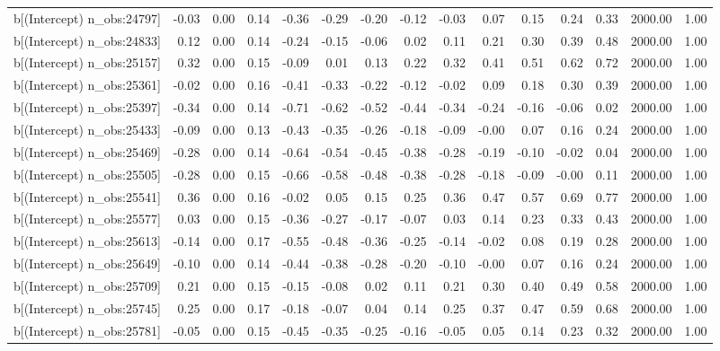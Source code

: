 \begin{table}[ht]
\begin{tabular}{rrrrrrrrrrrrrrr}
  b[(Intercept) n\_obs:24797] & -0.03 & 0.00 & 0.14 & -0.36 & -0.29 & -0.20 & -0.12 & -0.03 & 0.07 & 0.15 & 0.24 & 0.33 & 2000.00 & 1.00 \\ 
  b[(Intercept) n\_obs:24833] & 0.12 & 0.00 & 0.14 & -0.24 & -0.15 & -0.06 & 0.02 & 0.11 & 0.21 & 0.30 & 0.39 & 0.48 & 2000.00 & 1.00 \\ 
  b[(Intercept) n\_obs:25157] & 0.32 & 0.00 & 0.15 & -0.09 & 0.01 & 0.13 & 0.22 & 0.32 & 0.41 & 0.51 & 0.62 & 0.72 & 2000.00 & 1.00 \\ 
  b[(Intercept) n\_obs:25361] & -0.02 & 0.00 & 0.16 & -0.41 & -0.33 & -0.22 & -0.12 & -0.02 & 0.09 & 0.18 & 0.30 & 0.39 & 2000.00 & 1.00 \\ 
  b[(Intercept) n\_obs:25397] & -0.34 & 0.00 & 0.14 & -0.71 & -0.62 & -0.52 & -0.44 & -0.34 & -0.24 & -0.16 & -0.06 & 0.02 & 2000.00 & 1.00 \\ 
  b[(Intercept) n\_obs:25433] & -0.09 & 0.00 & 0.13 & -0.43 & -0.35 & -0.26 & -0.18 & -0.09 & -0.00 & 0.07 & 0.16 & 0.24 & 2000.00 & 1.00 \\ 
  b[(Intercept) n\_obs:25469] & -0.28 & 0.00 & 0.14 & -0.64 & -0.54 & -0.45 & -0.38 & -0.28 & -0.19 & -0.10 & -0.02 & 0.04 & 2000.00 & 1.00 \\ 
  b[(Intercept) n\_obs:25505] & -0.28 & 0.00 & 0.15 & -0.66 & -0.58 & -0.48 & -0.38 & -0.28 & -0.18 & -0.09 & -0.00 & 0.11 & 2000.00 & 1.00 \\ 
  b[(Intercept) n\_obs:25541] & 0.36 & 0.00 & 0.16 & -0.02 & 0.05 & 0.15 & 0.25 & 0.36 & 0.47 & 0.57 & 0.69 & 0.77 & 2000.00 & 1.00 \\ 
  b[(Intercept) n\_obs:25577] & 0.03 & 0.00 & 0.15 & -0.36 & -0.27 & -0.17 & -0.07 & 0.03 & 0.14 & 0.23 & 0.33 & 0.43 & 2000.00 & 1.00 \\ 
  b[(Intercept) n\_obs:25613] & -0.14 & 0.00 & 0.17 & -0.55 & -0.48 & -0.36 & -0.25 & -0.14 & -0.02 & 0.08 & 0.19 & 0.28 & 2000.00 & 1.00 \\ 
  b[(Intercept) n\_obs:25649] & -0.10 & 0.00 & 0.14 & -0.44 & -0.38 & -0.28 & -0.20 & -0.10 & -0.00 & 0.07 & 0.16 & 0.24 & 2000.00 & 1.00 \\ 
  b[(Intercept) n\_obs:25709] & 0.21 & 0.00 & 0.15 & -0.15 & -0.08 & 0.02 & 0.11 & 0.21 & 0.30 & 0.40 & 0.49 & 0.58 & 2000.00 & 1.00 \\ 
  b[(Intercept) n\_obs:25745] & 0.25 & 0.00 & 0.17 & -0.18 & -0.07 & 0.04 & 0.14 & 0.25 & 0.37 & 0.47 & 0.59 & 0.68 & 2000.00 & 1.00 \\ 
  b[(Intercept) n\_obs:25781] & -0.05 & 0.00 & 0.15 & -0.45 & -0.35 & -0.25 & -0.16 & -0.05 & 0.05 & 0.14 & 0.23 & 0.32 & 2000.00 & 1.00 \\ 

\end{tabular}
\end{table}

